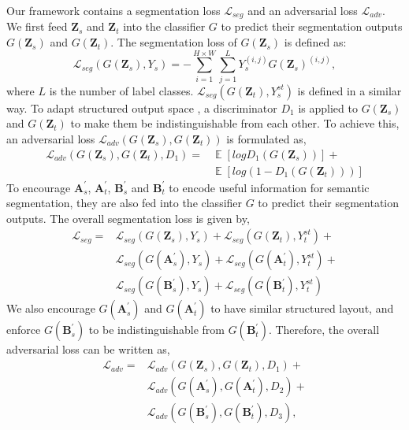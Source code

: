 \documentclass[10pt,twocolumn,letterpaper]{article}
\begin{document}
	Our framework contains a segmentation loss $ \mathcal{L}_{seg} $ and an adversarial loss $ \mathcal{L}_{adv} $. We first feed $ \textbf{Z}_s $ and $ \textbf{Z}_t $ into the classifier $ G $ to predict their segmentation outputs $ G(\textbf{Z}_s) $ and $ G(\textbf{Z}_t) $. The segmentation loss of $ G(\textbf{Z}_s) $ is defined as:
	\begin{equation}
	\mathcal{L}_{seg}(G(\textbf{Z}_s), Y_s) = -\sum_{i=1}^{H \times W}\sum_{j=1}^{L}Y_s^{(i, j)}G(\textbf{Z}_s)^{(i, j)},
	\end{equation}
	where $ L $ is the number of label classes. $ \mathcal{L}_{seg}(G(\textbf{Z}_t), Y_s^{st}) $ is defined in a similar way. To adapt structured output space \cite{tsai2018learning}, a discriminator $ D_1 $ is applied to $ G(\textbf{Z}_s) $ and $ G(\textbf{Z}_t) $ to make them be indistinguishable from each other. To achieve this, an adversarial loss $ \mathcal{L}_{adv}(G(\textbf{Z}_s), G(\textbf{Z}_t)) $ is formulated as,
	\begin{equation}
	\begin{aligned}
	\mathcal{L}_{adv}(G(\textbf{Z}_s), G(\textbf{Z}_t), D_1) = {} &
	\mathop{\mathbb{E}}[log{D_1(G(\textbf{Z}_s))}] + \\ &
	\mathop{\mathbb{E}}[log{(1 - D_1(G(\textbf{Z}_t)))}]
	\end{aligned}
	\end{equation}
	To encourage $ \textbf{A}_s^{'} $, $ \textbf{A}_t^{'} $, $ \textbf{B}_s^{'} $ and $ \textbf{B}_t^{'} $ to encode useful information for semantic segmentation, they are also fed into the classifier $ G $ to predict their segmentation outputs. The overall segmentation loss is given by,
	\begin{equation}
	\begin{aligned}
	\mathcal{L}_{seg}  = {} &
	\mathcal{L}_{seg}(G(\textbf{Z}_s), Y_s) + \mathcal{L}_{seg}(G(\textbf{Z}_t), Y_t^{st}) + \\ & \mathcal{L}_{seg}(G(\textbf{A}_s^{'}), Y_s) +  \mathcal{L}_{seg}(G(\textbf{A}_t^{'}), Y_t^{st}) + \\ & \mathcal{L}_{seg}(G(\textbf{B}_s^{'}), Y_s) + \mathcal{L}_{seg}(G(\textbf{B}_t^{'}), Y_t^{st})
	\end{aligned}
	\end{equation}
	We also encourage $ G(\textbf{A}_s^{'}) $ and $ G(\textbf{A}_t^{'}) $ to have similar structured layout, and enforce $ G(\textbf{B}_s^{'}) $ to be indistinguishable from $ G(\textbf{B}_t^{'}) $. Therefore, the overall adversarial loss can be written as,
	\begin{equation}
	\begin{aligned}
	\mathcal{L}_{adv} = {} &
	\mathcal{L}_{adv}(G(\textbf{Z}_s), G(\textbf{Z}_t), D_1) + \\ &
	\mathcal{L}_{adv}(G(\textbf{A}_s^{'}), G(\textbf{A}_t^{'}), D_2) + \\ &
	\mathcal{L}_{adv}(G(\textbf{B}_s^{'}), G(\textbf{B}_t^{'}), D_3),
	\end{aligned}
	\end{equation}
\end{document}

